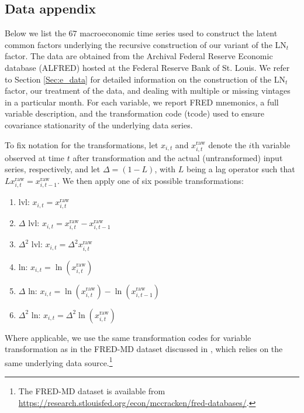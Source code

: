 \documentclass[12pt,letterpaper,leqno,doublespacing]{article}
\begin{document}
\clearpage
\begin{appendices}

\setcounter{table}{0}
\renewcommand{\thetable}{A.\arabic{table}}

\section{Data appendix}\label{Sec:e_data_appendix}
Below we list the $67$ macroeconomic time series used to construct the latent common factors underlying the recursive construction of our variant of the LN$_{t}$ factor. The data are obtained from the Archival Federal Reserve Economic database (ALFRED) hosted at the Federal Reserve Bank of St. Louis. We refer to Section \ref{Sec:e_data} for detailed information on the construction of the LN$_{t}$ factor, our treatment of the data, and dealing with multiple or missing vintages in a particular month. For each variable, we report FRED mnemonics, a full variable description, and the transformation code (tcode) used to ensure covariance stationarity of the underlying data series. 

To fix notation for the transformations, let $x_{i,t}$ and $x_{i,t}^{\text{raw}}$ denote the $i$th variable observed at time $t$ after transformation and the actual (untransformed) input series, respectively, and let $\Delta = \left(1-L\right)$, with $L$ being a lag operator such that $Lx_{i,t}^{\text{raw}} = x_{i,t-1}^{\text{raw}}$. We then apply one of six possible transformations:
\begin{enumerate}
      \item lvl: $x_{i,t} = x_{i,t}^{\text{raw}}$
      \item $\Delta$ lvl: $x_{i,t} = x_{i,t}^{\text{raw}} - x_{i,t-1}^{\text{raw}}$
      \item $\Delta^{2}$ lvl: $x_{i,t} = \Delta^{2} x_{i,t}^{\text{raw}}$ 
      \item ln: $x_{i,t} = \ln \left(x_{i,t}^{\text{raw}}\right)$ 
      \item $\Delta$ ln: $x_{i,t} = \ln\left(x_{i,t}^{\text{raw}}\right) - \ln\left(x_{i,t-1}^{\text{raw}}\right)$
      \item $\Delta^{2}$ ln: $x_{i,t} = \Delta^{2} \ln\left(x_{i,t}^{\text{raw}}\right)$
\end{enumerate} 
Where applicable, we use the same transformation codes for variable transformation as in the FRED-MD dataset discussed in \cite{McCrackenNg2015}, which relies on the same underlying data source.\footnote{The FRED-MD dataset is available from \url{https://research.stlouisfed.org/econ/mccracken/fred-databases/}.} 


\end{appendices}
\end{document}
